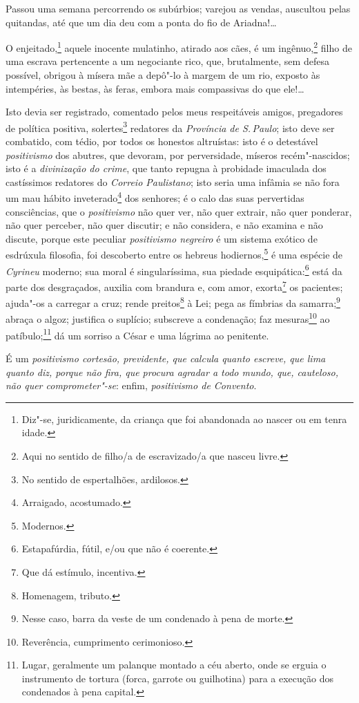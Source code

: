 Passou uma semana percorrendo os subúrbios; varejou as vendas, auscultou
pelas quitandas, até que um dia deu com a ponta do fio de Ariadna!\ldots{}

O enjeitado,\footnote{Diz"-se, juridicamente, da criança que foi
  abandonada ao nascer ou em tenra idade.} aquele inocente mulatinho,
atirado aos cães, é um ingênuo,\footnote{Aqui no sentido de filho/a de
  escravizado/a que nasceu livre.} filho de uma escrava pertencente a
um negociante rico, que, brutalmente, sem defesa possível, obrigou à
mísera mãe a depô"-lo à margem de um rio, exposto às intempéries, às
bestas, às feras, embora mais compassivas do que ele!\ldots{}

Isto devia ser registrado, comentado pelos meus respeitáveis amigos,
pregadores de política positiva, solertes\footnote{No sentido de
  espertalhões, ardilosos.} redatores da \emph{Província de S.\,Paulo};
isto deve ser combatido, com tédio, por todos os honestos altruístas:
isto é o detestável \emph{positivismo} dos abutres, que devoram, por
perversidade, míseros recém"-nascidos; isto é a \emph{divinização do
crime}, que tanto repugna à probidade imaculada dos castíssimos
redatores do \emph{Correio Paulistano}; isto seria uma infâmia se não
fora um mau hábito inveterado\footnote{Arraigado, acostumado.} dos
senhores; é o calo das suas pervertidas consciências, que o
\emph{positivismo} não quer ver, não quer extrair, não quer ponderar,
não quer perceber, não quer discutir; e não considera, e não examina e
não discute, porque este peculiar \emph{positivismo negreiro} é um
sistema exótico de esdrúxula filosofia, foi descoberto entre os hebreus
hodiernos,\footnote{Modernos.} é uma espécie de \emph{Cyrineu}
moderno; sua moral é singularíssima, sua piedade esquipática:\footnote{
  Estapafúrdia, fútil, e/ou que não é coerente.} está da parte dos
desgraçados, auxilia com brandura e, com amor, exorta\footnote{Que dá
  estímulo, incentiva.} os pacientes; ajuda"-os a carregar a cruz; rende
preitos\footnote{Homenagem, tributo.} à Lei; pega as fímbrias da
samarra;\footnote{Nesse caso, barra da veste de um condenado à pena de
  morte.} abraça o algoz; justifica o suplício; subscreve a condenação;
faz mesuras\footnote{Reverência, cumprimento cerimonioso.} ao
patíbulo;\footnote{Lugar, geralmente um palanque montado a céu aberto,
  onde se erguia o instrumento de tortura (forca, garrote ou guilhotina)
  para a execução dos condenados à pena capital.}
dá um sorriso a César e uma
lágrima ao penitente.

É um \emph{positivismo cortesão, previdente, que calcula quanto escreve,
que lima quanto diz, porque não fira, que procura agradar a todo mundo,
que, cauteloso, não quer comprometer"-se}: enfim, \emph{positivismo de
Convento}.

